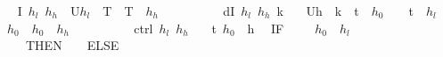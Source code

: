 \documentclass[envcountsame,envcountsect]{llncs}
\begin{document}
\begin{example}
\begin{isabellebody}
\isanewline
{}\ %
{\isachardoublequoteopen}I\ $h_l$\ $h_h$\ {\isasymequiv}\ U{\isacharparenleft}$h_l$\ {\isasymle}\ T\ {\isasymand}\ T\ {\isasymle}\ $h_h$\ {\isasymand}\ {\isacharparenleft}{\isasympi}\ {\isacharequal}\ {}\ {\isasymor}\ {\isasympi}\ {\isacharequal}\ {}{\isacharparenright}{\isacharparenright}{\isachardoublequoteclose}\isanewline
\isanewline
{}\ %
{\isachardoublequoteopen}dI\ $h_l$\ $h_h$\ k\ {\isasymequiv}\isanewline
\ \ U{\isacharparenleft}h\ {\isacharequal}\ k\ {\isasymcdot}\ t\ {\isacharplus}\ $h_0$\ {\isasymand}\ {}\ {\isasymle}\ t\ {\isasymand}\ $h_l$\ {\isasymle}\ $h_0$\ {\isasymand}\ $h_0$\ {\isasymle}\ $h_h$\ {\isasymand}\ {\isacharparenleft}{\isasympi}\ {\isacharequal}\ {}\ {\isasymor}\ {\isasympi}\ {\isacharequal}\ {}{\isacharparenright}{\isacharparenright}{\isachardoublequoteclose}\isanewline
\isanewline
{}\ %
{\isachardoublequoteopen}ctrl\ $h_l$\ $h_h$\ {\isasymequiv}\isanewline
\ \ {\isacharparenleft}t\ {\isacharcolon}{\isacharcolon}{\isacharequal}{}{\isacharparenright}{\isacharsemicolon}{\isacharparenleft}$h_0$\ {\isacharcolon}{\isacharcolon}{\isacharequal}\ h{\isacharparenright}{\isacharsemicolon}\isanewline
\ \ {\isacharparenleft}IF\ {\isacharparenleft}{\isasympi}\ {\isacharequal}\ {}\ {\isasymand}\ $h_0$\ {\isasymle}\ $h_l$\ {\isacharplus}\ {}{\isacharparenright}\ THEN\ {\isacharparenleft}{\isasympi}\ {\isacharcolon}{\isacharcolon}{\isacharequal}\ {}{\isacharparenright}\ ELSE\isanewline

\end{isabellebody}
\end{example}
\end{document}
